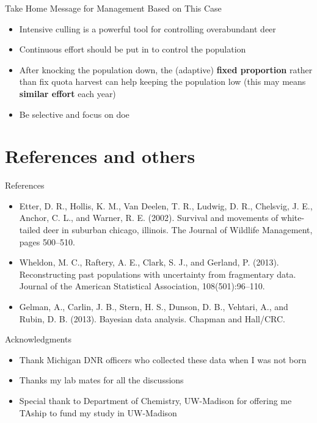 \documentclass{beamer}
\begin{document}
\begin{frame}{Take Home Message for Management Based on This Case}
\begin{itemize}
	\item Intensive culling is a powerful tool for controlling overabundant deer \pause
	\item Continuous effort should be put in to control the population \pause
	\item After knocking the population down, the (adaptive) \textbf{fixed proportion} rather than fix quota harvest can help keeping the population low (this may means \textbf{similar effort} each year) \pause
	\item Be selective and focus on doe
\end{itemize}
\end{frame}

\section{References and others}

\begin{frame}{References}
	\begin{itemize}
		\item Etter, D. R., Hollis, K. M., Van Deelen, T. R., Ludwig, D. R., Chelsvig, J. E., Anchor, C. L., and Warner, R. E. (2002). Survival and movements of white-tailed deer in suburban chicago, illinois. The Journal of Wildlife Management, pages 500–510.
		\item Wheldon, M. C., Raftery, A. E., Clark, S. J., and Gerland, P. (2013). Reconstructing past populations with uncertainty from fragmentary data. Journal of the American Statistical Association, 108(501):96–110.
		\item Gelman, A., Carlin, J. B., Stern, H. S., Dunson, D. B., Vehtari, A., and Rubin, D. B. (2013). Bayesian data analysis. Chapman and Hall/CRC.
	\end{itemize}
\end{frame}


\begin{frame}{Acknowledgments}
\begin{itemize}
	\item Thank Michigan DNR officers who collected these data when I was not born
	\item Thanks my lab mates for all the discussions 
	\item Special thank to Department of Chemistry, UW-Madison for offering me TAship to fund my study in UW-Madison
\end{itemize}
\end{frame}
\end{document}
